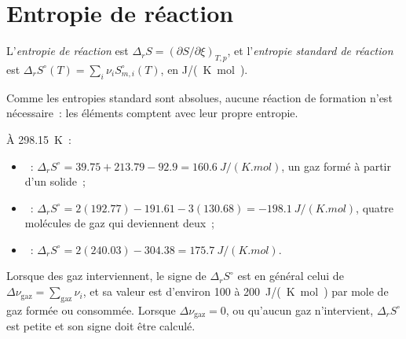 \section{Entropie de réaction}

\begin{definition}\label{def:b2:reaction-free-energy:reaction-entropy}
L'\emph{entropie de réaction} est $\Delta_r S =
(\partial S/\partial\xi)_{T,p}$, et l'\emph{entropie standard de
réaction} est $\Delta_r S^\circ(T) =
\sum_i\nu_iS^\circ_{m,i}(T)$, en \unit{J/(K.mol)}.
\end{definition}

Comme les entropies standard sont absolues, aucune réaction de formation n'est nécessaire~:
les éléments comptent avec leur propre entropie.

\begin{example}\label{ex:b2:reaction-free-energy:entropies}
À \qty{298.15}{K}~:
\begin{itemize}
  \item {}~: $\Delta_r S^\circ = 39.75 + 213.79 -
        92.9 = \qty{+160.6}{J/(K.mol)}$, un gaz formé à partir d'un solide~;
  \item {}~: $\Delta_r S^\circ = 2(192.77) -
        191.61 - 3(130.68) = \qty{-198.1}{J/(K.mol)}$, quatre molécules de gaz
        qui deviennent deux~;
  \item {}~: $\Delta_r S^\circ = 2(240.03) - 304.38 =
        \qty{+175.7}{J/(K.mol)}$.
\end{itemize}
\end{example}

\begin{proposition}\label{prop:b2:reaction-free-energy:sign-rule}
Lorsque des gaz interviennent, le signe de $\Delta_r S^\circ$ est en général celui de
$\Delta\nu_{\text{gaz}} = \sum_{\text{gaz}}\nu_i$, et sa valeur est d'environ
\qty{100}{} à \qty{200}{J/(K.mol)} par mole de gaz formée ou consommée. Lorsque
$\Delta\nu_{\text{gaz}} = 0$, ou qu'aucun gaz n'intervient, $\Delta_r S^\circ$ est
petite et son signe doit être calculé.
\end{proposition}

